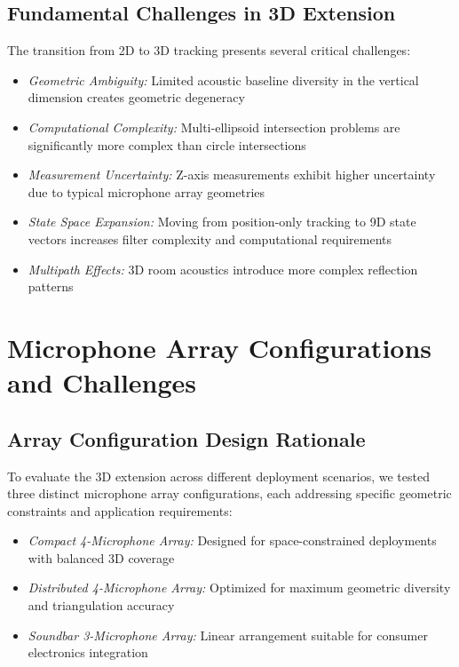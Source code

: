 \documentclass[a4paper]{article}
\begin{document}
\subsection{Fundamental Challenges in 3D Extension}

The transition from 2D to 3D tracking presents several critical challenges:

\begin{itemize}
\item {\em Geometric Ambiguity:} Limited acoustic baseline diversity in the vertical dimension creates geometric degeneracy
\item {\em Computational Complexity:} Multi-ellipsoid intersection problems are significantly more complex than circle intersections
\item {\em Measurement Uncertainty:} Z-axis measurements exhibit higher uncertainty due to typical microphone array geometries
\item {\em State Space Expansion:} Moving from position-only tracking to 9D state vectors increases filter complexity and computational requirements
\item {\em Multipath Effects:} 3D room acoustics introduce more complex reflection patterns
\end{itemize}

\section{Microphone Array Configurations and Challenges}

\subsection{Array Configuration Design Rationale}

To evaluate the 3D extension across different deployment scenarios, we tested three distinct microphone array configurations, each addressing specific geometric constraints and application requirements:

\begin{itemize}
\item {\em Compact 4-Microphone Array:} Designed for space-constrained deployments with balanced 3D coverage
\item {\em Distributed 4-Microphone Array:} Optimized for maximum geometric diversity and triangulation accuracy
\item {\em Soundbar 3-Microphone Array:} Linear arrangement suitable for consumer electronics integration
\end{itemize}
\end{document}
